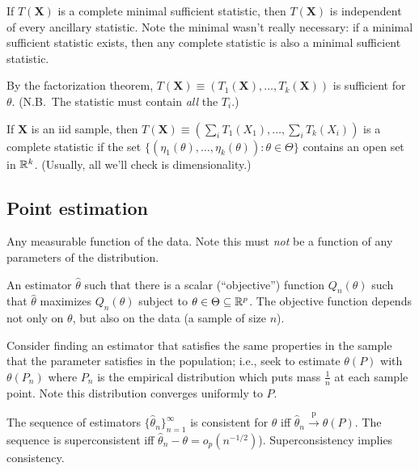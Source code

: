 \documentclass[8pt,letterpaper, landscape]{extarticle} %
\newcommand{\mX}{\ensuremath{\mathbf{X}}}
\begin{document}
\begin{multicols}{3}
\begin{description}
 If $ T(\mX) $ is a complete minimal sufficient statistic, then $ T(\mX) $ is independent of every ancillary statistic. Note the minimal wasn't really necessary: if a minimal sufficient statistic exists, then any complete statistic is also a minimal sufficient statistic.

 By the factorization theorem, $ T(\mX) \equiv (T_1(\mX), \dotsc , T_k(\mX)) $ is sufficient for $ \theta $. (N.B.\ The statistic must contain \textit{all} the $ T_i $.)

If $ \mX $ is an iid sample, then $ T(\mX) \equiv (\sum_i T_1(X_1), \dotsc , \sum_i T_k(X_i)) $ is a complete statistic if the set $ \{ (\eta_1(\theta), \dotsc, \eta_k(\theta)) \colon \theta \in \Theta \} $ contains an open set in $ \mathbb{R}^k $. (Usually, all we'll check is dimensionality.)

\subsection{Point estimation}
 Any measurable function of the data. Note this must \textit{not} be a function of any parameters of the distribution.

 An estimator $ \hat{\theta} $ such that there is a scalar (``objective'') function $ Q_n (\theta) $ such that $ \hat{\theta} $ maximizes $ Q_n(\theta) $ subject to $ \theta \in \Theta \subseteq \mathbb{R}^p $. The objective function depends not only on $ \theta $, but also on the data (a sample of size $ n $).

 Consider finding an estimator that satisfies the same properties in the sample that the parameter satisfies in the population; i.e., seek to estimate $ \theta(P) $ with $ \theta(P_n) $ where $ P_n $ is the empirical distribution which puts mass $ \tfrac{1}{n} $ at each sample point. Note this distribution converges uniformly to $ P $.

 The sequence of estimators $ \{ \hat{\theta}_n \}_{n=1}^{\infty} $ is consistent for $ \theta $ iff $ \hat{\theta}_n \xrightarrow{\text{p}} \theta(P) $. The sequence is superconsistent iff $ \hat{\theta}_n - \theta = o_p (n^{-1/2}) $). Superconsistency implies consistency.


\end{description}
\end{multicols}
\end{document}
